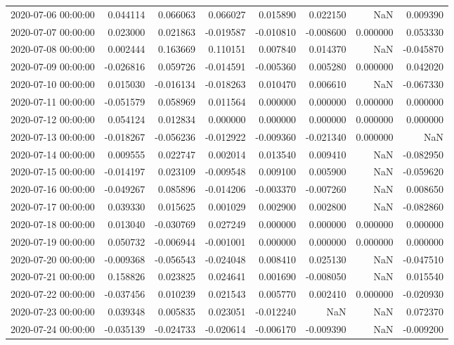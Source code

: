 \begin{tabular}{lrrrrrrr}
2020-07-06 00:00:00 & 0.044114 & 0.066063 & 0.066027 & 0.015890 & 0.022150 & NaN & 0.009390 \\
2020-07-07 00:00:00 & 0.023000 & 0.021863 & -0.019587 & -0.010810 & -0.008600 & 0.000000 & 0.053330 \\
2020-07-08 00:00:00 & 0.002444 & 0.163669 & 0.110151 & 0.007840 & 0.014370 & NaN & -0.045870 \\
2020-07-09 00:00:00 & -0.026816 & 0.059726 & -0.014591 & -0.005360 & 0.005280 & 0.000000 & 0.042020 \\
2020-07-10 00:00:00 & 0.015030 & -0.016134 & -0.018263 & 0.010470 & 0.006610 & NaN & -0.067330 \\
2020-07-11 00:00:00 & -0.051579 & 0.058969 & 0.011564 & 0.000000 & 0.000000 & 0.000000 & 0.000000 \\
2020-07-12 00:00:00 & 0.054124 & 0.012834 & 0.000000 & 0.000000 & 0.000000 & 0.000000 & 0.000000 \\
2020-07-13 00:00:00 & -0.018267 & -0.056236 & -0.012922 & -0.009360 & -0.021340 & 0.000000 & NaN \\
2020-07-14 00:00:00 & 0.009555 & 0.022747 & 0.002014 & 0.013540 & 0.009410 & NaN & -0.082950 \\
2020-07-15 00:00:00 & -0.014197 & 0.023109 & -0.009548 & 0.009100 & 0.005900 & NaN & -0.059620 \\
2020-07-16 00:00:00 & -0.049267 & 0.085896 & -0.014206 & -0.003370 & -0.007260 & NaN & 0.008650 \\
2020-07-17 00:00:00 & 0.039330 & 0.015625 & 0.001029 & 0.002900 & 0.002800 & NaN & -0.082860 \\
2020-07-18 00:00:00 & 0.013040 & -0.030769 & 0.027249 & 0.000000 & 0.000000 & 0.000000 & 0.000000 \\
2020-07-19 00:00:00 & 0.050732 & -0.006944 & -0.001001 & 0.000000 & 0.000000 & 0.000000 & 0.000000 \\
2020-07-20 00:00:00 & -0.009368 & -0.056543 & -0.024048 & 0.008410 & 0.025130 & NaN & -0.047510 \\
2020-07-21 00:00:00 & 0.158826 & 0.023825 & 0.024641 & 0.001690 & -0.008050 & NaN & 0.015540 \\
2020-07-22 00:00:00 & -0.037456 & 0.010239 & 0.021543 & 0.005770 & 0.002410 & 0.000000 & -0.020930 \\
2020-07-23 00:00:00 & 0.039348 & 0.005835 & 0.023051 & -0.012240 & NaN & NaN & 0.072370 \\
2020-07-24 00:00:00 & -0.035139 & -0.024733 & -0.020614 & -0.006170 & -0.009390 & NaN & -0.009200 \\

\end{tabular}
